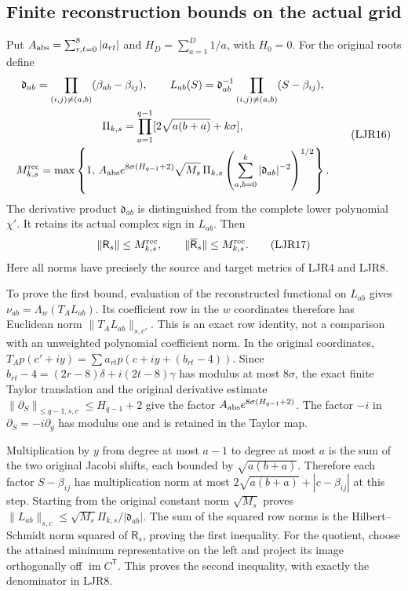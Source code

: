\documentclass[11pt,a4paper]{article}
\begin{document}
\subsection{Finite reconstruction bounds on the actual grid}

Put $A_{\rm abs}=\sum_{r,t=0}^8|a_{rt}|$ and
$H_D=\sum_{a=1}^D1/a$, with $H_0=0$. For the original roots define
\[
 \begin{gathered}
 \mathfrak d_{ab}=\prod_{(i,j)\ne(a,b)}(\beta_{ab}-\beta_{ij}),\qquad
 L_{ab}(S)=\mathfrak d_{ab}^{-1}
                         \prod_{(i,j)\ne(a,b)}(S-\beta_{ij}),\\
 \Pi_{k,s}=\prod_{a=1}^{q-1}[2\sqrt{a(b+a)}+k\sigma],\\
 M_{k,s}^{\rm rec}=\max\left\{1,\,
 A_{\rm abs}e^{8\sigma(H_{q-1}+2)}\sqrt{M_s}\,
            \Pi_{k,s}\left(\sum_{a,b=0}^k|\mathfrak d_{ab}|^{-2}
                     \right)^{1/2}\right\}.
 \end{gathered}\tag{LJR16}
\]
The derivative product $\mathfrak d_{ab}$ is distinguished from
the complete lower polynomial $\chi'$. It retains its actual
complex sign in $L_{ab}$. Then
\[
 \|\mathsf R_s\|\le M_{k,s}^{\rm rec},\qquad
 \|\overline{\mathsf R}_s\|\le M_{k,s}^{\rm rec}.
 \tag{LJR17}
\]
Here all norms have precisely the source and target metrics of
LJR4 and LJR8.

To prove the first bound, evaluation of the reconstructed
functional on $L_{ab}$ gives
$\nu_{ab}=\Lambda_w(T_A L_{ab})$. Its coefficient row in the
$w$ coordinates therefore has Euclidean norm
$\|T_A L_{ab}\|_{s,c'}$. This is an exact row identity, not
a comparison with an unweighted polynomial coefficient norm.
In the original coordinates,
$T_Ap(c'+iy)=\sum a_{rt}p(c+i y+(b_{rt}-4))$.
Since $b_{rt}-4=(2r-8)\delta+i(2t-8)\gamma$ has modulus
at most $8\sigma$, the exact finite Taylor translation and
the original derivative estimate
$\|\partial_S\|_{\le q-1,s,c}\le H_{q-1}+2$
give the factor $A_{\rm abs}e^{8\sigma(H_{q-1}+2)}$.
The factor $-i$ in $\partial_S=-i\partial_y$ has modulus one
and is retained in the Taylor map.

Multiplication by $y$ from degree at most $a-1$ to degree at
most $a$ is the sum of the two original Jacobi shifts, each
bounded by $\sqrt{a(b+a)}$. Therefore each factor
$S-\beta_{ij}$ has multiplication norm at most
$2\sqrt{a(b+a)}+|c-\beta_{ij}|$ at this step.
Starting from the original constant norm $\sqrt{M_s}$ proves
$\|L_{ab}\|_{s,c}\le\sqrt{M_s}\Pi_{k,s}/|\mathfrak d_{ab}|$.
The sum of the squared row norms is the Hilbert--Schmidt norm
squared of $\mathsf R_s$, proving the first inequality.
For the quotient, choose the attained minimum representative
on the left and project its image orthogonally off
$\operatorname{im}C^{\mathsf T}$. This proves the second
inequality, with exactly the denominator in LJR8.
\end{document}
